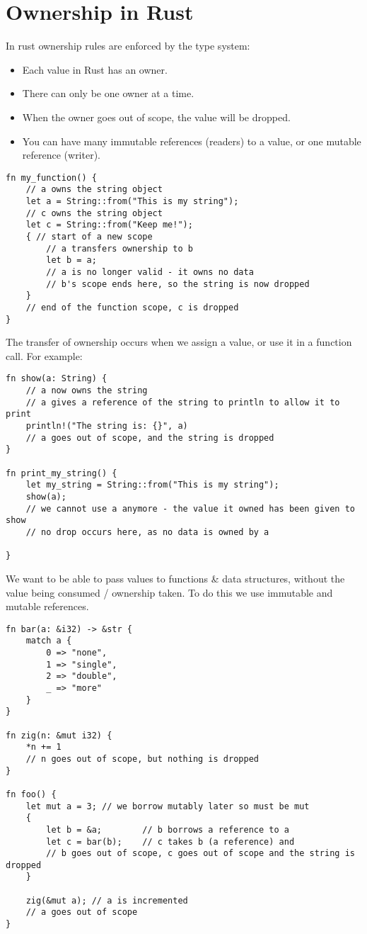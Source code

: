 \section{Ownership in Rust}
In rust ownership rules are enforced by the type system:
\begin{itemize}
	\item Each value in Rust has an owner.
	\item There can only be one owner at a time.
	\item When the owner goes out of scope, the value will be dropped.
	\item You can have many immutable references (readers) to a value, or one mutable reference (writer).
\end{itemize}
\begin{verbatim}
fn my_function() {
    // a owns the string object
    let a = String::from("This is my string");
    // c owns the string object
    let c = String::from("Keep me!");
    { // start of a new scope
        // a transfers ownership to b
        let b = a;
        // a is no longer valid - it owns no data
        // b's scope ends here, so the string is now dropped
    }
    // end of the function scope, c is dropped
}
\end{verbatim}

The transfer of ownership occurs when we assign a value, or use it in a function call. For example:
\begin{verbatim}
fn show(a: String) {
    // a now owns the string
    // a gives a reference of the string to println to allow it to print
    println!("The string is: {}", a)
    // a goes out of scope, and the string is dropped
}

fn print_my_string() {
    let my_string = String::from("This is my string");
    show(a);
    // we cannot use a anymore - the value it owned has been given to show
    // no drop occurs here, as no data is owned by a

}
\end{verbatim}

We want to be able to pass values to functions \& data structures, without the value being consumed / ownership taken. To do this we use immutable and mutable references.
\begin{verbatim}
fn bar(a: &i32) -> &str {
    match a {
        0 => "none",
        1 => "single",
        2 => "double",
        _ => "more"
    }
}

fn zig(n: &mut i32) {
    *n += 1
    // n goes out of scope, but nothing is dropped
}

fn foo() {
    let mut a = 3; // we borrow mutably later so must be mut
    {
        let b = &a;        // b borrows a reference to a
        let c = bar(b);    // c takes b (a reference) and 
        // b goes out of scope, c goes out of scope and the string is dropped
    }

    zig(&mut a); // a is incremented
    // a goes out of scope
}
\end{verbatim}

